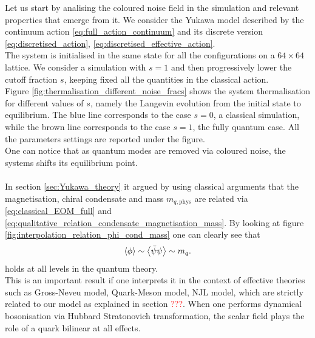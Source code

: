 Let us start by analising the coloured noise field in the simulation and relevant properties that emerge from it. We consider the Yukawa model described by the continuum action \eqref{eq:full_action_continuum} and its discrete version \eqref{eq:discretised_action}, \eqref{eq:discretised_effective_action}.\\
The system is initialised in the same state for all the configurations on a $64 \times 64$ lattice. We consider a simulation with $s=1$ and then progressively lower the cutoff fraction $s$, keeping fixed all the quantities in the classical action. \\
Figure \ref{fig:thermalisation_different_noise_fracs} shows the system thermalisation for different values of $s$, namely the Langevin evolution from the initial state to equilibrium. The blue line corresponds to the case $s=0$, a classical simulation, while the brown line corresponds to the case $s=1$, the fully quantum case.  All the parameters settings are reported under the figure. \\
One can notice that as quantum modes are removed via coloured noise, the systems shifts its equilibrium point. \\~\\ 
In section \ref{sec:Yukawa_theory} it argued by using classical arguments that the magnetisation, chiral condensate and mass $m_{q, \text{phys}}$ are related via \eqref{eq:classical_EOM_full} and \eqref{eq:qualitative_relation_condensate_magnetisation_mass}. By looking at figure \ref{fig:interpolation_relation_phi_cond_mass} one can clearly see that 
\begin{equation*}
	\left\langle \phi \right\rangle \sim \left\langle \bar\psi\psi \right\rangle \sim m_q.
\end{equation*}
holds at all levels in the quantum theory. \\
This is an important result if one interprets it in the context of effective theories such as Gross-Neveu model, Quark-Meson model, NJL model, which are strictly related to our model as explained in section \textcolor{red}{???}. When one performs dynamical bosonisation via Hubbard Stratonovich transformation, the scalar field plays the role of a quark bilinear at all effects.
